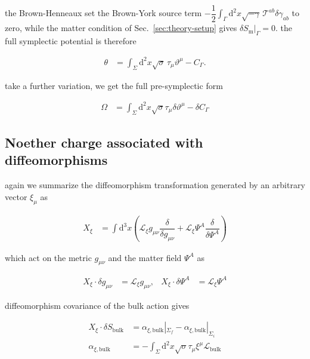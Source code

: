 the Brown-Henneaux set the Brown-York source term $\displaystyle{-\dfrac{1}{2}\int _{\Gamma}\mathrm{d}^{2}x\sqrt{-\gamma}\,\mathcal{T}^{ab}\delta\gamma _{ab}}$ to zero, while the matter condition of Sec.~\ref{sec:theory-setup} gives $\displaystyle{\left.\delta S_{\mathrm{m}}\right|_{\Gamma}=0}$. the full symplectic potential is therefore

\begin{align}
\theta & =\int _{\Sigma}\mathrm{d}^{2}x\sqrt{\sigma}\,\tau _{\mu}\vartheta ^{\mu}-C_{\Gamma}.
\end{align}

take a further variation, we get the full pre-symplectic form

\begin{align}
\Omega & =\int _{\Sigma}\mathrm{d}^{2}x\sqrt{ \sigma }\tau _{\mu}\delta \vartheta ^{\mu}-\delta C_{\Gamma}
\end{align}

\subsection{Noether charge associated with diffeomorphisms}\label{subsec:full-theory-noether-charge}

again we summarize the diffeomorphism transformation generated by an arbitrary vector $\displaystyle{\xi _{\mu}}$ as

\begin{align}
X_{\xi} & =\int \mathrm{d}^{3}x\left(\mathcal{L}_{\xi}g_{\mu \nu} \dfrac{\delta}{\delta g_{\mu \nu}}+ \mathcal{L}_{\xi}\Psi^{A} \dfrac{\delta}{\delta \Psi^{A}}\right)
\end{align}

which act on the metric $\displaystyle{g_{\mu \nu}}$ and the matter field $\displaystyle{\Psi^{A}}$ as

\begin{align}
X_{\xi}\cdot \delta g_{\mu \nu} & =\mathcal{L}_{\xi}g_{\mu \nu}, & X_{\xi}\cdot \delta \Psi^{A} & =\mathcal{L}_{\xi}\Psi^{A}
\end{align}

diffeomorphism covariance of the bulk action gives

\begin{align}
X_{\xi}\cdot \delta S_{\mathrm{bulk}} & =\alpha _{\xi,\mathrm{bulk}}|_{\Sigma _{f}}-\alpha _{\xi,\mathrm{bulk}}|_{\Sigma _{i}} \\
\alpha _{\xi,\mathrm{bulk}} & =-\int _{\Sigma}\mathrm{d}^{2}x\sqrt{ \sigma }\tau _{\mu}\xi ^{\mu}\mathcal{L}_{\mathrm{bulk}}
\end{align}

